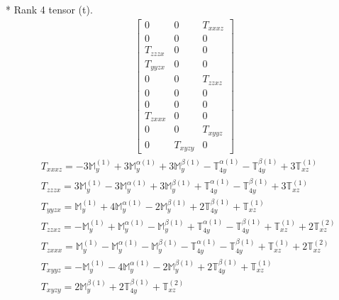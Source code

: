 \documentclass[fleqn,8pt,landscape]{jsarticle}
\begin{document}
* Rank 4 tensor (t).
\begin{align*}
\begin{bmatrix} 0 & 0 & T_{xxxz} \\ 0 & 0 & 0 \\ T_{zzzx} & 0 & 0 \\ T_{yyzx} & 0 & 0 \\ 0 & 0 & T_{zzxz} \\ 0 & 0 & 0 \\ 0 & 0 & 0 \\ T_{zxxx} & 0 & 0 \\ 0 & 0 & T_{xyyz} \\ 0 & T_{xyzy} & 0 \end{bmatrix}
\end{align*}
\begin{align*}
& T_{xxxz} = - 3 \mathbb{M}_{y}^{(1)} + 3 \mathbb{M}_{y}^{\alpha(1)} + 3 \mathbb{M}_{y}^{\beta(1)} - \mathbb{T}_{4y}^{\alpha(1)} - \mathbb{T}_{4y}^{\beta(1)} + 3 \mathbb{T}_{xz}^{(1)} \\
& T_{zzzx} = 3 \mathbb{M}_{y}^{(1)} - 3 \mathbb{M}_{y}^{\alpha(1)} + 3 \mathbb{M}_{y}^{\beta(1)} + \mathbb{T}_{4y}^{\alpha(1)} - \mathbb{T}_{4y}^{\beta(1)} + 3 \mathbb{T}_{xz}^{(1)} \\
& T_{yyzx} = \mathbb{M}_{y}^{(1)} + 4 \mathbb{M}_{y}^{\alpha(1)} - 2 \mathbb{M}_{y}^{\beta(1)} + 2 \mathbb{T}_{4y}^{\beta(1)} + \mathbb{T}_{xz}^{(1)} \\
& T_{zzxz} = - \mathbb{M}_{y}^{(1)} + \mathbb{M}_{y}^{\alpha(1)} - \mathbb{M}_{y}^{\beta(1)} + \mathbb{T}_{4y}^{\alpha(1)} - \mathbb{T}_{4y}^{\beta(1)} + \mathbb{T}_{xz}^{(1)} + 2 \mathbb{T}_{xz}^{(2)} \\
& T_{zxxx} = \mathbb{M}_{y}^{(1)} - \mathbb{M}_{y}^{\alpha(1)} - \mathbb{M}_{y}^{\beta(1)} - \mathbb{T}_{4y}^{\alpha(1)} - \mathbb{T}_{4y}^{\beta(1)} + \mathbb{T}_{xz}^{(1)} + 2 \mathbb{T}_{xz}^{(2)} \\
& T_{xyyz} = - \mathbb{M}_{y}^{(1)} - 4 \mathbb{M}_{y}^{\alpha(1)} - 2 \mathbb{M}_{y}^{\beta(1)} + 2 \mathbb{T}_{4y}^{\beta(1)} + \mathbb{T}_{xz}^{(1)} \\
& T_{xyzy} = 2 \mathbb{M}_{y}^{\beta(1)} + 2 \mathbb{T}_{4y}^{\beta(1)} + \mathbb{T}_{xz}^{(2)}
\end{align*}
\end{document}
